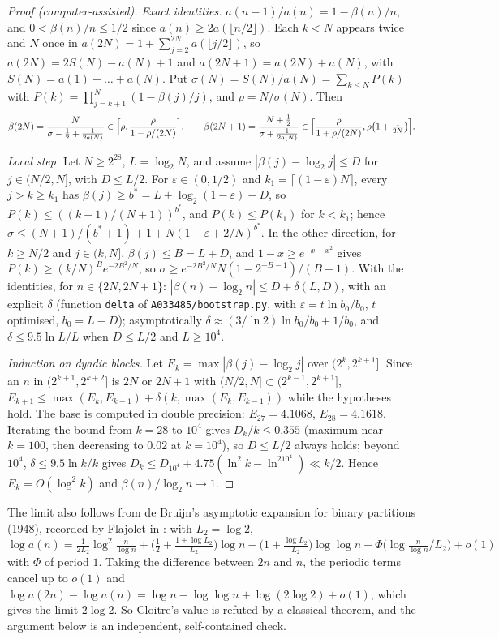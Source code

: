 \begin{proof}[Proof (computer-assisted)] \emph{Exact identities.} $a(n-1)/a(n)=1-\beta(n)/n$, and
$0<\beta(n)/n\le1/2$ since $a(n)\ge2a(\lfloor n/2\rfloor)$. Each $k<N$ appears twice and $N$ once in
$a(2N)=1+\sum_{j=2}^{2N}a(\lfloor j/2\rfloor)$, so $a(2N)=2S(N)-a(N)+1$ and $a(2N+1)=a(2N)+a(N)$, with
$S(N)=a(1)+\dots+a(N)$. Put $\sigma(N)=S(N)/a(N)=\sum_{k\le N}P(k)$ with $P(k)=\prod_{j=k+1}^N(1-\beta(j)/j)$, and
$\rho=N/\sigma(N)$. Then
\[ \beta(2N)=\frac{N}{\sigma-\frac12+\frac1{2a(N)}}\in\Bigl[\rho,\frac{\rho}{1-\rho/(2N)}\Bigr],\qquad
   \beta(2N+1)=\frac{N+\frac12}{\sigma+\frac1{2a(N)}}\in\Bigl[\frac{\rho}{1+\rho/(2N)},\rho\bigl(1+\tfrac1{2N}\bigr)\Bigr]. \]

\emph{Local step.} Let $N\ge2^{28}$, $L=\log_2N$, and assume $|\beta(j)-\log_2j|\le D$ for $j\in(N/2,N]$, with
$D\le L/2$. For $\varepsilon\in(0,1/2)$ and $k_1=\lceil(1-\varepsilon)N\rceil$, every $j>k\ge k_1$ has
$\beta(j)\ge b^*=L+\log_2(1-\varepsilon)-D$, so $P(k)\le((k+1)/(N+1))^{b^*}$, and $P(k)\le P(k_1)$ for $k<k_1$; hence
$\sigma\le(N+1)/(b^*+1)+1+N(1-\varepsilon+2/N)^{b^*}$. In the other direction, for $k\ge N/2$ and $j\in(k,N]$,
$\beta(j)\le B=L+D$, and $1-x\ge e^{-x-x^2}$ gives $P(k)\ge(k/N)^Be^{-2B^2/N}$, so
$\sigma\ge e^{-2B^2/N}N(1-2^{-B-1})/(B+1)$. With the identities, for $n\in\{2N,2N+1\}$:
$|\beta(n)-\log_2n|\le D+\delta(L,D)$, with an explicit $\delta$ (function \texttt{delta} of
\texttt{A033485/bootstrap.py}, with $\varepsilon=t\ln b_0/b_0$, $t$ optimised, $b_0=L-D$); asymptotically
$\delta\approx(3/\ln2)\ln b_0/b_0+1/b_0$, and $\delta\le9.5\ln L/L$ when $D\le L/2$ and $L\ge10^4$.

\emph{Induction on dyadic blocks.} Let $E_k=\max|\beta(j)-\log_2j|$ over $(2^k,2^{k+1}]$. Since an $n$ in
$(2^{k+1},2^{k+2}]$ is $2N$ or $2N+1$ with $(N/2,N]\subset(2^{k-1},2^{k+1}]$,
$E_{k+1}\le\max(E_k,E_{k-1})+\delta(k,\max(E_k,E_{k-1}))$ while the hypotheses hold. The base is computed in double
precision: $E_{27}=4.1068$, $E_{28}=4.1618$. Iterating the bound from $k=28$ to $10^4$ gives $D_k/k\le0.355$
(maximum near $k=100$, then decreasing to $0.02$ at $k=10^4$), so $D\le L/2$ always holds; beyond $10^4$,
$\delta\le9.5\ln k/k$ gives $D_k\le D_{10^4}+4.75(\ln^2k-\ln^210^4)\ll k/2$. Hence $E_k=O(\log^2k)$ and
$\beta(n)/\log_2n\to1$. \end{proof}
\begin{remark} The limit also follows from de Bruijn's asymptotic expansion
for binary partitions (1948), recorded by Flajolet in : with $L_2=\log2$,
$\log a(n)=\frac1{2L_2}\log^2\frac n{\log n}+\bigl(\frac12+\frac{1+\log L_2}{L_2}\bigr)\log n-\bigl(1+\frac{\log L_2}{L_2}\bigr)\log\log n
+\Phi\bigl(\log\frac n{\log n}/L_2\bigr)+o(1)$ with $\Phi$ of period $1$. Taking the difference between $2n$ and $n$, the
periodic terms cancel up to $o(1)$ and $\log a(2n)-\log a(n)=\log n-\log\log n+\log(2\log2)+o(1)$, which gives the
limit $2\log2$. So Cloitre's value is refuted by a classical theorem, and the argument below is an independent,
self-contained check.\end{remark}
